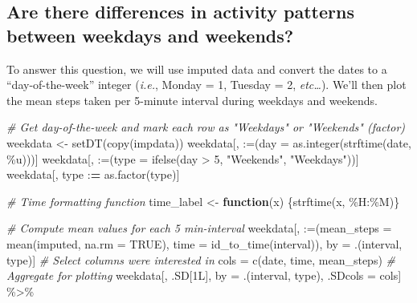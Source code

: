 \documentclass[
  paper=a4,
  ,captions=tableheading
]{scrartcl}
\newenvironment{Shaded}{\begin{snugshade}}{\end{snugshade}}
\newcommand{\AttributeTok}[1]{\textcolor[rgb]{0.77,0.63,0.00}{#1}}
\newcommand{\CommentTok}[1]{\textcolor[rgb]{0.56,0.35,0.01}{\textit{#1}}}
\newcommand{\ConstantTok}[1]{\textcolor[rgb]{0.00,0.00,0.00}{#1}}
\newcommand{\ControlFlowTok}[1]{\textcolor[rgb]{0.13,0.29,0.53}{\textbf{#1}}}
\newcommand{\DecValTok}[1]{\textcolor[rgb]{0.00,0.00,0.81}{#1}}
\newcommand{\ErrorTok}[1]{\textcolor[rgb]{0.64,0.00,0.00}{\textbf{#1}}}
\newcommand{\FunctionTok}[1]{\textcolor[rgb]{0.00,0.00,0.00}{#1}}
\newcommand{\NormalTok}[1]{#1}
\newcommand{\OtherTok}[1]{\textcolor[rgb]{0.56,0.35,0.01}{#1}}
\newcommand{\SpecialCharTok}[1]{\textcolor[rgb]{0.00,0.00,0.00}{#1}}
\newcommand{\StringTok}[1]{\textcolor[rgb]{0.31,0.60,0.02}{#1}}
\begin{document}
\hypertarget{are-there-differences-in-activity-patterns-between-weekdays-and-weekends}{%
\subsection{Are there differences in activity patterns between weekdays
and
weekends?}\label{are-there-differences-in-activity-patterns-between-weekdays-and-weekends}}

To answer this question, we will use imputed data and convert the dates
to a ``day-of-the-week'' integer (\emph{i.e.}, Monday = 1, Tuesday = 2,
\emph{etc\ldots{}}). We'll then plot the mean steps taken per 5-minute
interval during weekdays and weekends.

\begin{Shaded}
\begin{Highlighting}[]
\CommentTok{\# Get day{-}of{-}the{-}week and mark each row as "Weekdays" or "Weekends" (factor)}
\NormalTok{weekdata }\OtherTok{\textless{}{-}} \FunctionTok{setDT}\NormalTok{(}\FunctionTok{copy}\NormalTok{(impdata))}
\NormalTok{weekdata[, }\StringTok{\textasciigrave{}}\AttributeTok{:=}\StringTok{\textasciigrave{}}\NormalTok{(}\AttributeTok{day =} \FunctionTok{as.integer}\NormalTok{(}\FunctionTok{strftime}\NormalTok{(date, }\StringTok{\textquotesingle{}\%u\textquotesingle{}}\NormalTok{)))]}
\NormalTok{weekdata[, }\StringTok{\textasciigrave{}}\AttributeTok{:=}\StringTok{\textasciigrave{}}\NormalTok{(}\AttributeTok{type =} \FunctionTok{ifelse}\NormalTok{(day }\SpecialCharTok{\textgreater{}} \DecValTok{5}\NormalTok{, }\StringTok{"Weekends"}\NormalTok{, }\StringTok{"Weekdays"}\NormalTok{))]}
\NormalTok{weekdata[, type }\SpecialCharTok{:}\ErrorTok{=} \FunctionTok{as.factor}\NormalTok{(type)]}

\CommentTok{\# Time formatting function}
\NormalTok{time\_label }\OtherTok{\textless{}{-}} \ControlFlowTok{function}\NormalTok{(x) \{}\FunctionTok{strftime}\NormalTok{(x, }\StringTok{\textquotesingle{}\%H:\%M\textquotesingle{}}\NormalTok{)\}}

\CommentTok{\# Compute mean values for each 5 min{-}interval}
\NormalTok{weekdata[, }\StringTok{\textasciigrave{}}\AttributeTok{:=}\StringTok{\textasciigrave{}}\NormalTok{(}\AttributeTok{mean\_steps =} \FunctionTok{mean}\NormalTok{(imputed, }\AttributeTok{na.rm =} \ConstantTok{TRUE}\NormalTok{),}
                \AttributeTok{time =} \FunctionTok{id\_to\_time}\NormalTok{(interval)),}
\NormalTok{     by }\OtherTok{=}\NormalTok{ .(interval, type)]}
\CommentTok{\# Select columns we\textquotesingle{}re interested in}
\NormalTok{cols }\OtherTok{=} \FunctionTok{c}\NormalTok{(}\StringTok{\textquotesingle{}date\textquotesingle{}}\NormalTok{, }\StringTok{\textquotesingle{}time\textquotesingle{}}\NormalTok{, }\StringTok{\textquotesingle{}mean\_steps\textquotesingle{}}\NormalTok{)}
\CommentTok{\# Aggregate for plotting}
\NormalTok{weekdata[, .SD[1L], by }\OtherTok{=}\NormalTok{ .(interval, type), .SDcols }\OtherTok{=}\NormalTok{ cols] }\SpecialCharTok{\%\textgreater{}\%}
  

\end{Highlighting}
\end{Shaded}
\end{document}
